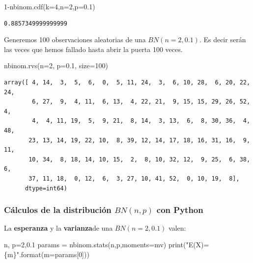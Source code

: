 \documentclass[
  letterpaper,
  DIV=11,
  numbers=noendperiod]{scrreprt}
\newenvironment{Shaded}{\begin{snugshade}}{\end{snugshade}}
\newcommand{\BuiltInTok}[1]{\textcolor[rgb]{0.00,0.23,0.31}{#1}}
\newcommand{\DecValTok}[1]{\textcolor[rgb]{0.68,0.00,0.00}{#1}}
\newcommand{\FloatTok}[1]{\textcolor[rgb]{0.68,0.00,0.00}{#1}}
\newcommand{\NormalTok}[1]{\textcolor[rgb]{0.00,0.23,0.31}{#1}}
\newcommand{\OperatorTok}[1]{\textcolor[rgb]{0.37,0.37,0.37}{#1}}
\newcommand{\SpecialCharTok}[1]{\textcolor[rgb]{0.37,0.37,0.37}{#1}}
\newcommand{\StringTok}[1]{\textcolor[rgb]{0.13,0.47,0.30}{#1}}
\begin{document}
\begin{Shaded}
\begin{Highlighting}[]
\DecValTok{1}\OperatorTok{{-}}\NormalTok{nbinom.cdf(k}\OperatorTok{=}\DecValTok{4}\NormalTok{,n}\OperatorTok{=}\DecValTok{2}\NormalTok{,p}\OperatorTok{=}\FloatTok{0.1}\NormalTok{)}
\end{Highlighting}
\end{Shaded}

\begin{verbatim}
0.8857349999999999
\end{verbatim}

Generemos 100 observaciones aleatorias de una \(BN(n=2,0.1)\). Es decir
serán las veces que hemos fallado hasta abrir la puerta 100 veces.

\begin{Shaded}
\begin{Highlighting}[]
\NormalTok{nbinom.rvs(n}\OperatorTok{=}\DecValTok{2}\NormalTok{, p}\OperatorTok{=}\FloatTok{0.1}\NormalTok{, size}\OperatorTok{=}\DecValTok{100}\NormalTok{)}
\end{Highlighting}
\end{Shaded}

\begin{verbatim}
array([ 4, 14,  3,  5,  6,  0,  5, 11, 24,  3,  6, 10, 28,  6, 20, 22, 24,
        6, 27,  9,  4, 11,  6, 13,  4, 22, 21,  9, 15, 15, 29, 26, 52,  4,
        4,  4, 11, 19,  5,  9, 21,  8, 14,  3, 13,  6,  8, 30, 36,  4, 48,
       23, 13, 14, 19, 22, 10,  8, 39, 12, 14, 17, 18, 16, 31, 16,  9, 11,
       10, 34,  8, 18, 14, 10, 15,  2,  8, 10, 32, 12,  9, 25,  6, 38,  6,
       37, 11, 18,  0, 12,  6,  3, 27, 10, 41, 52,  0, 10, 19,  8],
      dtype=int64)
\end{verbatim}

\subsubsection{\texorpdfstring{Cálculos de la distribución \(BN(n,p)\)
con
Python}{Cálculos de la distribución BN(n,p) con Python}}\label{cuxe1lculos-de-la-distribuciuxf3n-bnnp-con-python}

La \textbf{esperanza} y la \textbf{varianza}de una \(BN(n=2,0.1)\)
valen:

\begin{Shaded}
\begin{Highlighting}[]
\NormalTok{n, p}\OperatorTok{=}\DecValTok{2}\NormalTok{,}\FloatTok{0.1}
\NormalTok{params }\OperatorTok{=}\NormalTok{ nbinom.stats(n,p,moments}\OperatorTok{=}\StringTok{\textquotesingle{}mv\textquotesingle{}}\NormalTok{)}
\BuiltInTok{print}\NormalTok{(}\StringTok{"E(X)=}\SpecialCharTok{\{m\}}\StringTok{"}\NormalTok{.}\BuiltInTok{format}\NormalTok{(m}\OperatorTok{=}\NormalTok{params[}\DecValTok{0}\NormalTok{]))}
\end{Highlighting}
\end{Shaded}
\end{document}

